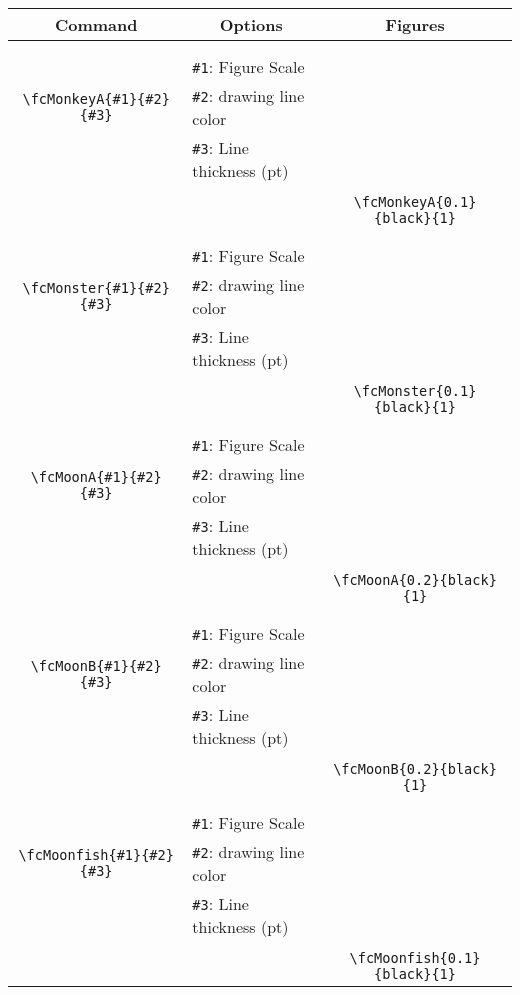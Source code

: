 \documentclass[x11names]{article}
\begin{document}
\begin{table}[H]\centering\begin{tabular}{|c|l|c|}\hline {\bf Command}& \multicolumn{1}{c|}{{\bf Options}} & {\bf Figures}\\  \hline	&&\multirow{5}{*}{\fcMonkeyA{0.1}{black}{1}}\\	&&\\	&\verb|#1|: Figure Scale &\\	\verb|\fcMonkeyA{#1}{#2}{#3}|&	\verb|#2|: drawing line color &\\	&\verb|#3|: Line thickness (pt) &\\ &&\\&&	\verb|\fcMonkeyA{0.1}{black}{1}|\\\hline 	
	&&\multirow{5}{*}{\fcMonster{0.1}{black}{1}}\\	&&\\	&\verb|#1|: Figure Scale &\\	\verb|\fcMonster{#1}{#2}{#3}|&	\verb|#2|: drawing line color &\\	&\verb|#3|: Line thickness (pt) &\\ &&\\&&	\verb|\fcMonster{0.1}{black}{1}|\\\hline 	
	&&\multirow{5}{*}{\fcMoonA{0.2}{black}{1}}\\	&&\\	&\verb|#1|: Figure Scale &\\	\verb|\fcMoonA{#1}{#2}{#3}|&	\verb|#2|: drawing line color &\\	&\verb|#3|: Line thickness (pt) &\\ &&\\&&	\verb|\fcMoonA{0.2}{black}{1}|\\\hline 	
	&&\multirow{5}{*}{\fcMoonB{0.2}{black}{1}}\\	&&\\	&\verb|#1|: Figure Scale &\\	\verb|\fcMoonB{#1}{#2}{#3}|&	\verb|#2|: drawing line color &\\	&\verb|#3|: Line thickness (pt) &\\ &&\\&&	\verb|\fcMoonB{0.2}{black}{1}|\\\hline 	
	&&\multirow{5}{*}{\fcMoonfish{0.1}{black}{1}}\\	&&\\	&\verb|#1|: Figure Scale &\\	\verb|\fcMoonfish{#1}{#2}{#3}|&	\verb|#2|: drawing line color &\\	&\verb|#3|: Line thickness (pt) &\\ &&\\&&	\verb|\fcMoonfish{0.1}{black}{1}|\\\hline 	

\end{tabular}
\end{table}
\end{document}

